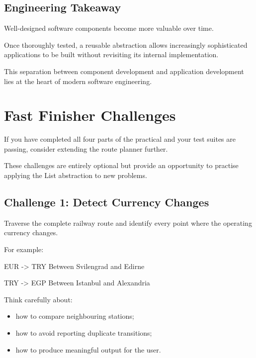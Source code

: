 \documentclass{csc2059practical}
\begin{document}
\subsection{Engineering Takeaway}

\begin{importantnote}
Well-designed software components become more valuable over time.

Once thoroughly tested, a reusable abstraction allows increasingly sophisticated applications to be built without revisiting its internal implementation.

This separation between component development and application development lies at the heart of modern software engineering.
\end{importantnote}


\section{Fast Finisher Challenges}

If you have completed all four parts of the practical and your test suites are passing, consider extending the route planner further.

These challenges are entirely optional but provide an opportunity to practise applying the List abstraction to new problems.


\subsection*{Challenge 1: Detect Currency Changes}

Traverse the complete railway route and identify every point where the operating currency changes.

For example:

\begin{terminal}
EUR -> TRY
Between Svilengrad and Edirne

TRY -> EGP
Between Istanbul and Alexandria
\end{terminal}

Think carefully about:

\begin{itemize}
    \item how to compare neighbouring stations;
    \item how to avoid reporting duplicate transitions;
    \item how to produce meaningful output for the user.
\end{itemize}
\end{document}
